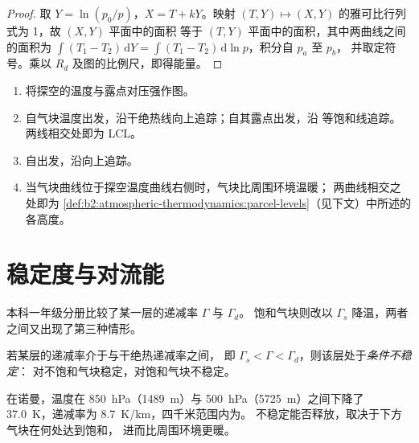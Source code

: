\begin{proof}
取 $Y = \ln(p_0/p)$，$X = T + kY$。映射 $(T, Y) \mapsto (X, Y)$ 的雅可比行列式为 1，故 $(X, Y)$ 平面中的面积
等于 $(T, Y)$ 平面中的面积，其中两曲线之间的面积为
$\int (T_1 - T_2)\,\mathrm{d}Y = \int (T_1 - T_2)\,\mathrm{d}\ln p$，积分自 $p_a$ 至 $p_b$，
并取定符号。乘以 $R_d$ 及图的比例尺，即得能量。
\end{proof}

\begin{method}[在图上抬升气块]\label{met:b2:atmospheric-thermodynamics:lift}
\begin{enumerate}
  \item 将探空的温度与露点对压强作图。
  \item 自气块温度出发，沿干绝热线向上追踪；自其露点出发，沿
        等饱和线追踪。两线相交处即为 LCL。
  \item 自出发，沿向上追踪。
  \item 当气块曲线位于探空温度曲线右侧时，气块比周围环境温暖；
        两曲线相交之处即为
        \cref{def:b2:atmospheric-thermodynamics:parcel-levels}（见下文）中所述的各高度。
\end{enumerate}
\end{method}


\section{稳定度与对流能}\label{sec:b2:atmospheric-thermodynamics:stability}

本科一年级分册比较了某一层的递减率 $\Gamma$ 与 $\Gamma_d$。
饱和气块则改以 $\Gamma_s$ 降温，两者之间又出现了第三种情形。

\begin{definition}[条件不稳定]\label{def:b2:atmospheric-thermodynamics:instability}
若某层的递减率介于与干绝热递减率之间，
即 $\Gamma_s < \Gamma < \Gamma_d$，则该层处于\emph{条件不稳定}：
对不饱和气块稳定，对饱和气块不稳定。
\end{definition}

在诺曼，温度在 \qty{850}{hPa}（\qty{1489}{m}）与
\qty{500}{hPa}（\qty{5725}{m}）之间下降了 \qty{37.0}{K}，递减率为 \qty{8.7}{K/km}，四千米范围内为。
不稳定能否释放，取决于下方气块在何处达到饱和，
进而比周围环境更暖。

